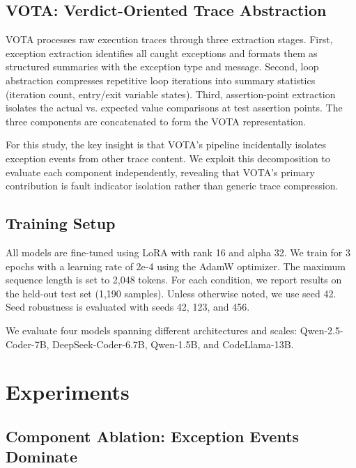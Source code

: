 \documentclass[11pt]{article}
\begin{document}
\subsection{VOTA: Verdict-Oriented Trace Abstraction}

VOTA processes raw execution traces through three extraction stages. First, exception extraction identifies all caught exceptions and formats them as structured summaries with the exception type and message. Second, loop abstraction compresses repetitive loop iterations into summary statistics (iteration count, entry/exit variable states). Third, assertion-point extraction isolates the actual vs. expected value comparisons at test assertion points. The three components are concatenated to form the VOTA representation.

For this study, the key insight is that VOTA's pipeline incidentally isolates exception events from other trace content. We exploit this decomposition to evaluate each component independently, revealing that VOTA's primary contribution is fault indicator isolation rather than generic trace compression.

\subsection{Training Setup}

All models are fine-tuned using LoRA \citep{hu2022lora} with rank 16 and alpha 32. We train for 3 epochs with a learning rate of 2e-4 using the AdamW optimizer. The maximum sequence length is set to 2,048 tokens. For each condition, we report results on the held-out test set (1,190 samples). Unless otherwise noted, we use seed 42. Seed robustness is evaluated with seeds 42, 123, and 456.

We evaluate four models spanning different architectures and scales: Qwen-2.5-Coder-7B, DeepSeek-Coder-6.7B, Qwen-1.5B, and CodeLlama-13B.

\section{Experiments}
\label{sec:experiments}

\subsection{Component Ablation: Exception Events Dominate}
\label{sec:component}
\end{document}

